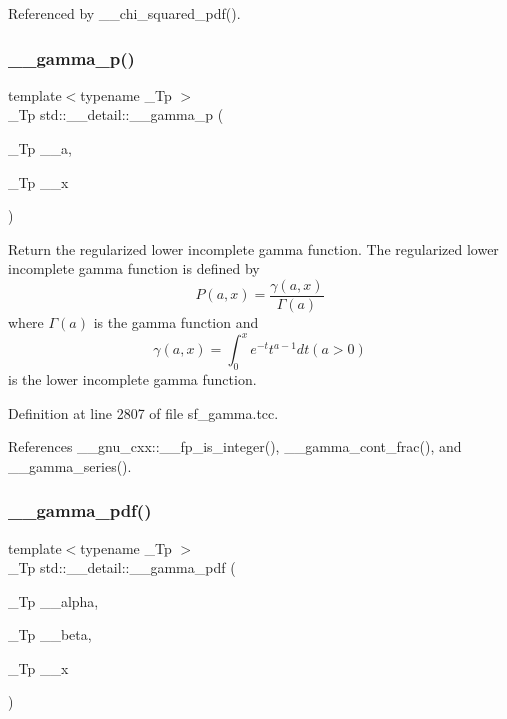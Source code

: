 Referenced by \+\_\+\+\_\+chi\+\_\+squared\+\_\+pdf().

\mbox{\label{namespacestd_1_1____detail_a4583981bd73c3d3bba970c2f91dc4ba5}} 
\subsubsection{\texorpdfstring{\+\_\+\+\_\+gamma\+\_\+p()}{\_\_gamma\_p()}\hspace{0.1cm}{\footnotesize\ttfamily [2/2]}}
{\footnotesize\ttfamily template$<$typename \+\_\+\+Tp $>$ \\
\+\_\+\+Tp std\+::\+\_\+\+\_\+detail\+::\+\_\+\+\_\+gamma\+\_\+p (\begin{DoxyParamCaption}\item[{\+\_\+\+Tp}]{\+\_\+\+\_\+a,  }\item[{\+\_\+\+Tp}]{\+\_\+\+\_\+x }\end{DoxyParamCaption})}



Return the regularized lower incomplete gamma function. The regularized lower incomplete gamma function is defined by \[ P(a,x) = \frac{\gamma(a,x)}{\Gamma(a)} \] where $ \Gamma(a) $ is the gamma function and \[ \gamma(a,x) = \int_0^x e^{-t}t^{a-1}dt (a > 0) \] is the lower incomplete gamma function. 



Definition at line 2807 of file sf\+\_\+gamma.\+tcc.



References \+\_\+\+\_\+gnu\+\_\+cxx\+::\+\_\+\+\_\+fp\+\_\+is\+\_\+integer(), \+\_\+\+\_\+gamma\+\_\+cont\+\_\+frac(), and \+\_\+\+\_\+gamma\+\_\+series().

\mbox{\label{namespacestd_1_1____detail_a13146321e4e094815de990c33b83b02a}} 
\subsubsection{\texorpdfstring{\+\_\+\+\_\+gamma\+\_\+pdf()}{\_\_gamma\_pdf()}}
{\footnotesize\ttfamily template$<$typename \+\_\+\+Tp $>$ \\
\+\_\+\+Tp std\+::\+\_\+\+\_\+detail\+::\+\_\+\+\_\+gamma\+\_\+pdf (\begin{DoxyParamCaption}\item[{\+\_\+\+Tp}]{\+\_\+\+\_\+alpha,  }\item[{\+\_\+\+Tp}]{\+\_\+\+\_\+beta,  }\item[{\+\_\+\+Tp}]{\+\_\+\+\_\+x }\end{DoxyParamCaption})}



